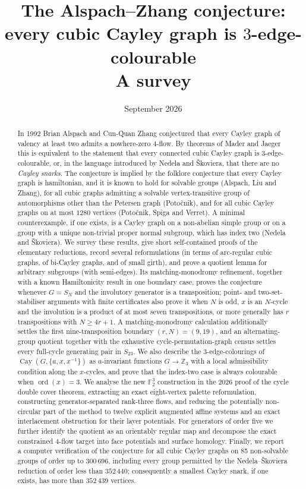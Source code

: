 \documentclass[11pt,a4paper]{article}
\title{The Alspach--Zhang conjecture:\\ every cubic Cayley graph is $3$-edge-colourable\\[1ex]\large A survey}
\author{}
\date{September 2026}
\theoremstyle{definition}
\theoremstyle{remark}
\newcommand{\Cay}{\operatorname{Cay}}
\newcommand{\ord}{\operatorname{ord}}
\begin{document}
\maketitle

\begin{abstract}
In 1992 Brian Alspach and Cun-Quan Zhang conjectured that every Cayley graph of valency at least two admits a nowhere-zero $4$-flow.  By theorems of Mader and Jaeger this is equivalent to the statement that every connected cubic Cayley graph is $3$-edge-colourable, or, in the language introduced by Nedela and \v{S}koviera, that there are no \emph{Cayley snarks}.  The conjecture is implied by the folklore conjecture that every Cayley graph is hamiltonian, and it is known to hold for solvable groups (Alspach, Liu and Zhang), for all cubic graphs admitting a solvable vertex-transitive group of automorphisms other than the Petersen graph (Poto\v{c}nik), and for all cubic Cayley graphs on at most $1280$ vertices (Poto\v{c}nik, Spiga and Verret).  A minimal counterexample, if one exists, is a Cayley graph on a non-abelian simple group or on a group with a unique non-trivial proper normal subgroup, which has index two (Nedela and \v{S}koviera).  We survey these results, give short self-contained proofs of the elementary reductions, record several reformulations (in terms of arc-regular cubic graphs, of bi-Cayley graphs, and of small girth), and prove a quotient lemma for arbitrary subgroups (with semi-edges).  Its matching-monodromy refinement, together with a known Hamiltonicity result in one boundary case, proves the conjecture whenever $G=S_N$ and the involutory generator is a transposition; point- and two-set-stabiliser arguments with finite certificates also prove it when $N$ is odd, $x$ is an $N$-cycle and the involution is a product of at most seven transpositions, or more generally has $r$ transpositions with $N\ge4r+1$.  A matching-monodromy calculation additionally settles the first nine-transposition boundary $(r,N)=(9,19)$, and an alternating-group quotient together with the exhaustive cycle-permutation-graph census settles every full-cycle generating pair in $S_{23}$.  We also describe the $3$-edge-colourings of $\Cay(G,\{a,x,x^{-1}\})$ as $a$-invariant functions $G\to\mathbb{Z}_3$ with a local admissibility condition along the $x$-cycles, and prove that the index-two case is always colourable when $\ord(x)=3$.  We analyse the new $\mathbb F_2^3$ construction in the 2026 proof of the cycle double cover theorem, extracting an exact eight-vertex palette reformulation, constructing generator-separated rank-three flows, and reducing the potentially non-circular part of the method to twelve explicit augmented affine systems and an exact interlacement obstruction for their layer potentials.  For generators of order five we further identify the quotient as an orientably regular map and decompose the exact constrained $4$-flow target into face potentials and surface homology.  Finally, we report a computer verification of the conjecture for all cubic Cayley graphs on 85 non-solvable groups of order up to $300\,696$, including every group permitted by the Nedela--\v{S}koviera reduction of order less than $352\,440$; consequently a smallest Cayley snark, if one exists, has more than $352\,439$ vertices.


\end{abstract}
\end{document}

